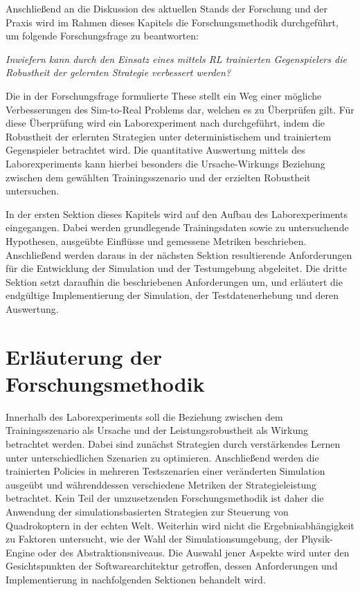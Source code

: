 Anschließend an die Diskussion des aktuellen Stands der Forschung und der Praxis wird im Rahmen dieses Kapitels die Forschungsmethodik durchgeführt, um folgende Forschungsfrage zu beantworten:

\textit{Inwiefern kann durch den Einsatz eines mittels RL trainierten Gegenspielers die Robustheit der gelernten Strategie verbessert werden?}

Die in der Forschungsfrage formulierte These stellt ein Weg einer mögliche Verbesserungen des Sim-to-Real Problems dar, welchen es zu Überprüfen gilt.
Für diese Überprüfung wird ein Laborexperiment nach \cite[]{Recker.2021} durchgeführt, indem die Robustheit der erlernten Strategien unter deterministischem und trainiertem Gegenspieler betrachtet wird. 
Die quantitative Auswertung mittels des Laborexperiments kann hierbei besonders die Ursache-Wirkungs Beziehung zwischen dem gewählten Trainingsszenario und der erzielten Robustheit untersuchen.

In der ersten Sektion dieses Kapitels wird auf den Aufbau des Laborexperiments eingegangen.
Dabei werden grundlegende Trainingsdaten sowie zu untersuchende Hypothesen, ausgeübte Einflüsse und gemessene Metriken beschrieben.
Anschließend werden daraus in der nächsten Sektion resultierende Anforderungen für die Entwicklung der Simulation und der Testumgebung abgeleitet. 
Die dritte Sektion setzt daraufhin die beschriebenen Anforderungen um, und erläutert die endgültige Implementierung der Simulation, der Testdatenerhebung und deren Auswertung.

\section{Erläuterung der Forschungsmethodik}

Innerhalb des Laborexperiments soll die Beziehung zwischen dem Trainingsszenario als Ursache und der Leistungsrobustheit als Wirkung betrachtet werden.
Dabei sind zunächst Strategien durch verstärkendes Lernen unter unterschiedlichen Szenarien zu optimieren. 
Anschließend werden die trainierten Policies in mehreren Testszenarien einer veränderten Simulation ausgeübt und währenddessen verschiedene Metriken der Strategieleistung betrachtet.
Kein Teil der umzusetzenden Forschungsmethodik ist daher die Anwendung der simulationsbasierten Strategien zur Steuerung von Quadrokoptern in der echten Welt. 
Weiterhin wird nicht die Ergebnisabhängigkeit zu Faktoren untersucht, wie der Wahl der Simulationsumgebung, der Physik-Engine oder des Abstraktionsniveaus.
Die Auswahl jener Aspekte wird unter den Gesichtspunkten der Softwarearchitektur getroffen, dessen Anforderungen und Implementierung in nachfolgenden Sektionen behandelt wird.

